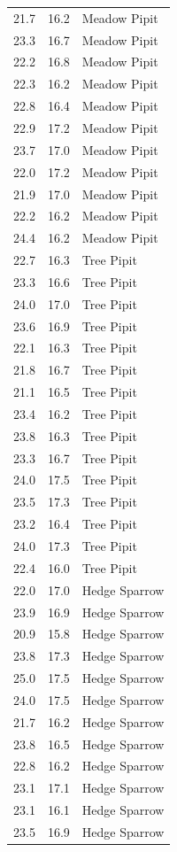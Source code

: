 \documentclass[
  letterpaper,
  DIV=11,
  numbers=noendperiod]{scrartcl}
\begin{document}
{\begin{longtable}[]{@{}rrl@{}}
21.7 & 16.2 & Meadow Pipit \\
23.3 & 16.7 & Meadow Pipit \\
22.2 & 16.8 & Meadow Pipit \\
22.3 & 16.2 & Meadow Pipit \\
22.8 & 16.4 & Meadow Pipit \\
22.9 & 17.2 & Meadow Pipit \\
23.7 & 17.0 & Meadow Pipit \\
22.0 & 17.2 & Meadow Pipit \\
21.9 & 17.0 & Meadow Pipit \\
22.2 & 16.2 & Meadow Pipit \\
24.4 & 16.2 & Meadow Pipit \\
22.7 & 16.3 & Tree Pipit \\
23.3 & 16.6 & Tree Pipit \\
24.0 & 17.0 & Tree Pipit \\
23.6 & 16.9 & Tree Pipit \\
22.1 & 16.3 & Tree Pipit \\
21.8 & 16.7 & Tree Pipit \\
21.1 & 16.5 & Tree Pipit \\
23.4 & 16.2 & Tree Pipit \\
23.8 & 16.3 & Tree Pipit \\
23.3 & 16.7 & Tree Pipit \\
24.0 & 17.5 & Tree Pipit \\
23.5 & 17.3 & Tree Pipit \\
23.2 & 16.4 & Tree Pipit \\
24.0 & 17.3 & Tree Pipit \\
22.4 & 16.0 & Tree Pipit \\
22.0 & 17.0 & Hedge Sparrow \\
23.9 & 16.9 & Hedge Sparrow \\
20.9 & 15.8 & Hedge Sparrow \\
23.8 & 17.3 & Hedge Sparrow \\
25.0 & 17.5 & Hedge Sparrow \\
24.0 & 17.5 & Hedge Sparrow \\
21.7 & 16.2 & Hedge Sparrow \\
23.8 & 16.5 & Hedge Sparrow \\
22.8 & 16.2 & Hedge Sparrow \\
23.1 & 17.1 & Hedge Sparrow \\
23.1 & 16.1 & Hedge Sparrow \\
23.5 & 16.9 & Hedge Sparrow \\

\end{longtable}}
\end{document}
